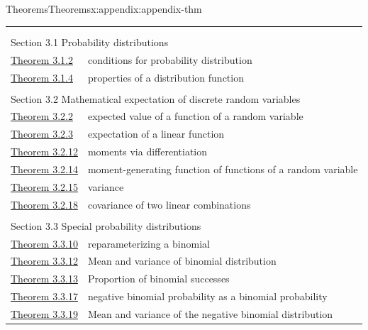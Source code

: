 \documentclass[oneside,10pt,]{book}
\begin{document}
\begin{appendixptx}{Theorems}{}{Theorems}{}{}{x:appendix:appendix-thm}
\noindent
\begin{longtable}[l]{ll}
\addtocounter{table}{-1}
\endfirsthead
\endhead
\multicolumn{2}{r}{(Continued on next page)}\\
\endfoot
\endlastfoot
\multicolumn{2}{l}{\null}\\[1.5ex] \multicolumn{2}{l}{\large Section 3.1 Probability distributions}\\[0.5ex]
\hyperref[x:theorem:thm-conditions-3-1]{Theorem 3.1.2}& conditions for probability distribution\\
\hyperref[x:theorem:thm-3-2]{Theorem 3.1.4}& properties of a distribution function\\
\multicolumn{2}{l}{\null}\\[1.5ex] \multicolumn{2}{l}{\large Section 3.2 Mathematical expectation of discrete random variables}\\[0.5ex]
\hyperref[x:theorem:thm-expected-value-function-random-variable-4-1]{Theorem 3.2.2}& expected value of a function of a random variable\\
\hyperref[x:theorem:thm-4-2]{Theorem 3.2.3}& expectation of a linear function\\
\hyperref[x:theorem:thm-4-9]{Theorem 3.2.12}& moments via differentiation\\
\hyperref[x:theorem:thm-4-10]{Theorem 3.2.14}& moment-generating function of functions of a random variable\\
\hyperref[x:theorem:thm-4-14]{Theorem 3.2.15}& variance\\
\hyperref[x:theorem:thm-4-15]{Theorem 3.2.18}& covariance of two linear combinations\\
\multicolumn{2}{l}{\null}\\[1.5ex] \multicolumn{2}{l}{\large Section 3.3 Special probability distributions}\\[0.5ex]
\hyperref[x:theorem:thm-bin-param]{Theorem 3.3.10}& reparameterizing a binomial\\
\hyperref[x:theorem:thm-bin-mean-var]{Theorem 3.3.12}& Mean and variance of binomial distribution\\
\hyperref[x:theorem:thm-bin-successes]{Theorem 3.3.13}& Proportion of binomial successes\\
\hyperref[x:theorem:thm-bin-negbin]{Theorem 3.3.17}& negative binomial probability as a binomial probability\\
\hyperref[g:theorem:idp140500432119024]{Theorem 3.3.19}& Mean and variance of the negative binomial distribution\\

\end{longtable}
\end{appendixptx}
\end{document}
